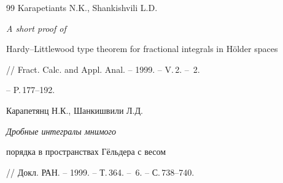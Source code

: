 \begin{thebibliography}{99}
Karapetiants N.K., Shankishvili L.D. {\it A short proof of 


Hardy--Littlewood type theorem for fractional integrals in H\"older spaces}


// Fract. Calc. and Appl. Anal. -- 1999. -- V.\,2. -- \No\,2.


-- P.\,177--192.




Карапетянц Н.К., Шанкишвили Л.Д. {\it Дробные интегралы мнимого


порядка в пространствах Г\"ельдера с весом}


// Докл. РАН. -- 1999. -- Т.\,364. -- \No\,6. -- С.\,738--740.





\end{thebibliography}





\vskip 2cm












\label{end}





